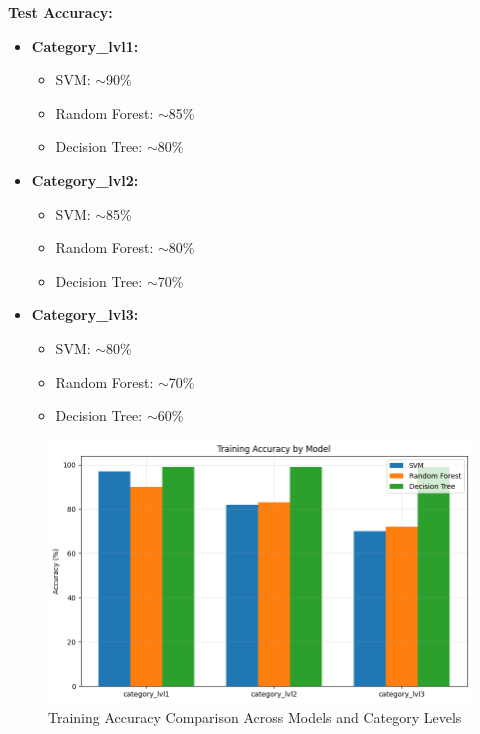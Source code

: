 \documentclass[10pt]{article}
\begin{document}
\textbf{Test Accuracy:}
\begin{itemize}
    \item \textbf{Category\_lvl1:}
    \begin{itemize}
        \item SVM: $\sim$90\%
        \item Random Forest: $\sim$85\%
        \item Decision Tree: $\sim$80\%
    \end{itemize}
    \item \textbf{Category\_lvl2:}
    \begin{itemize}
        \item SVM: $\sim$85\%
        \item Random Forest: $\sim$80\%
        \item Decision Tree: $\sim$70\%
    \end{itemize}
    \item \textbf{Category\_lvl3:}
    \begin{itemize}
        \item SVM: $\sim$80\%
        \item Random Forest: $\sim$70\%
        \item Decision Tree: $\sim$60\%
    \end{itemize}
\end{itemize}

\begin{figure}[H]
    \centering
    \includegraphics[width=1\textwidth]{modeltrain.png}
    \caption{Training Accuracy Comparison Across Models and Category Levels}
\end{figure}
\end{document}
